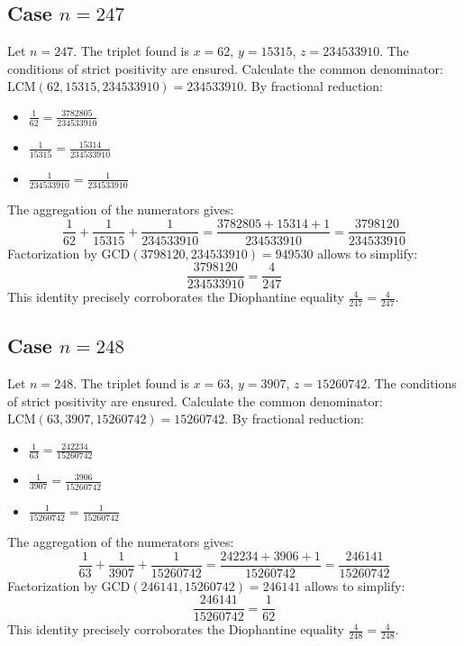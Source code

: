 \documentclass[11pt,a4paper]{article}
\begin{document}
\subsection{Case $n = 247$}
Let $n = 247$. The triplet found is $x = 62$, $y = 15315$, $z = 234533910$.
The conditions of strict positivity are ensured.
Calculate the common denominator: $\text{LCM}(62, 15315, 234533910) = 234533910$.
By fractional reduction:
\begin{itemize}
    \item $\frac{1}{62} = \frac{3782805}{234533910}$
    \item $\frac{1}{15315} = \frac{15314}{234533910}$
    \item $\frac{1}{234533910} = \frac{1}{234533910}$
\end{itemize}
The aggregation of the numerators gives:
$$ \frac{1}{62} + \frac{1}{15315} + \frac{1}{234533910} = \frac{3782805 + 15314 + 1}{234533910} = \frac{3798120}{234533910} $$
Factorization by $\text{GCD}(3798120, 234533910) = 949530$ allows to simplify:
$$ \frac{3798120}{234533910} = \frac{4}{247} $$
This identity precisely corroborates the Diophantine equality $\frac{4}{247} = \frac{4}{247}$.

\subsection{Case $n = 248$}
Let $n = 248$. The triplet found is $x = 63$, $y = 3907$, $z = 15260742$.
The conditions of strict positivity are ensured.
Calculate the common denominator: $\text{LCM}(63, 3907, 15260742) = 15260742$.
By fractional reduction:
\begin{itemize}
    \item $\frac{1}{63} = \frac{242234}{15260742}$
    \item $\frac{1}{3907} = \frac{3906}{15260742}$
    \item $\frac{1}{15260742} = \frac{1}{15260742}$
\end{itemize}
The aggregation of the numerators gives:
$$ \frac{1}{63} + \frac{1}{3907} + \frac{1}{15260742} = \frac{242234 + 3906 + 1}{15260742} = \frac{246141}{15260742} $$
Factorization by $\text{GCD}(246141, 15260742) = 246141$ allows to simplify:
$$ \frac{246141}{15260742} = \frac{1}{62} $$
This identity precisely corroborates the Diophantine equality $\frac{4}{248} = \frac{4}{248}$.
\end{document}
